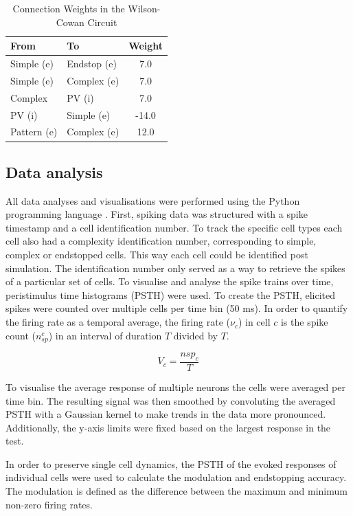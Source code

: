 \documentclass[12pt]{article}
\begin{document}
\begin{table}[H]
  \centering
  \caption{Connection Weights in the Wilson-Cowan Circuit}
  \label{tab:weights}
  \begin{tabular}{@{}llc@{}}
      \toprule
      \textbf{From} & \textbf{To} & \textbf{Weight} \\ \midrule
      Simple (e) & Endstop (e) & 7.0 \\
      Simple (e) & Complex (e) & 7.0 \\
      Complex & PV (i) & 7.0 \\
      PV (i) & Simple (e) & -14.0 \\
      Pattern (e) & Complex (e) & 12.0 \\ \bottomrule
  \end{tabular}
\end{table}

\subsection*{Data analysis}
All data analyses and visualisations were performed using the Python programming language \autocite{vanrossumPythonTutorial1995}. First, spiking data was structured with a spike timestamp and a cell identification number. To track the specific cell types each cell also had a complexity identification number, corresponding to simple, complex or endstopped cells. This way each cell could be identified post simulation. The identification number only served as a way to retrieve the spikes of a particular set of cells. To visualise and analyse the spike trains over time, peristimulus time histograms (PSTH) were used. To create the PSTH, elicited spikes were counted over multiple cells per time bin (50 ms). In order to quantify the firing rate as a temporal average, the firing rate ($\nu_c$) in cell $c$ is the spike count ($n_{sp}^c$) in an interval of duration $T$ divided by $T$.

\[
V_c = \frac{nsp_c}{T}
\]

To visualise the average response of multiple neurons the cells were averaged per time bin. The resulting signal was then smoothed by convoluting the averaged PSTH with a Gaussian kernel to make trends in the data more pronounced. Additionally, the y-axis limits were fixed based on the largest response in the test.

In order to preserve single cell dynamics, the PSTH of the evoked responses of individual cells were used to calculate the modulation and endstopping accuracy. The modulation is defined as the difference between the maximum and minimum non-zero firing rates. 
\end{document}
